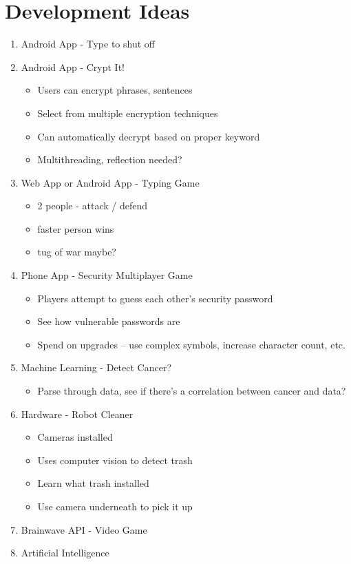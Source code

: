 \documentclass[10pt]{article}
\begin{document}
\section*{Development Ideas}
\begin{enumerate}
    \item Android App - Type to shut off
    \item Android App - Crypt It!
    \begin{itemize}
        \item Users can encrypt phrases, sentences
        \item Select from multiple encryption techniques
        \item Can automatically decrypt based on proper keyword
        \item Multithreading, reflection needed?
    \end{itemize}
    \item Web App or Android App - Typing Game
    \begin{itemize}
        \item 2 people - attack / defend
        \item faster person wins
        \item tug of war maybe?
    \end{itemize}
    \item Phone App - Security Multiplayer Game
    \begin{itemize}
        \item Players attempt to guess each other's security password
        \item See how vulnerable passwords are
        \item Spend on upgrades -- use complex symbols, increase character count, etc.
    \end{itemize}
    \item Machine Learning - Detect Cancer?
    \begin{itemize}
        \item Parse through data, see if there's a correlation between cancer and data?
    \end{itemize}
    \item Hardware - Robot Cleaner
    \begin{itemize}
        \item Cameras installed
        \item Uses computer vision to detect trash
        \item Learn what trash installed
        \item Use camera underneath to pick it up
    \end{itemize}
    \item Brainwave API - Video Game
    \item Artificial Intelligence
\end{enumerate}
\end{document}
